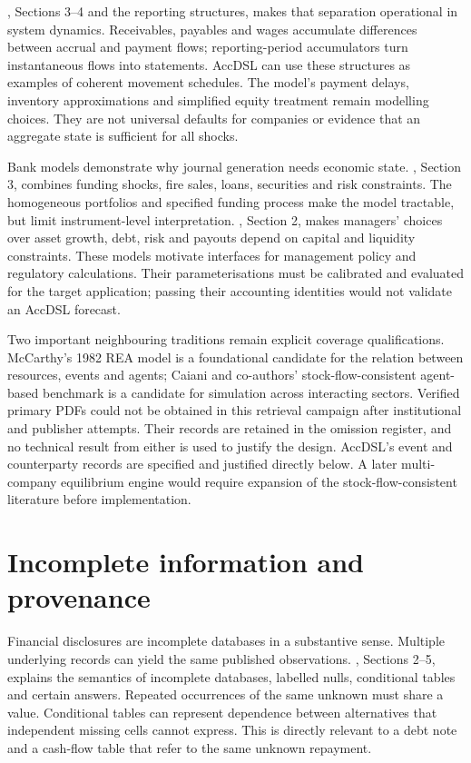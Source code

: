 \citet{pierson2020}, Sections 3--4 and the reporting structures, makes that
separation operational in system dynamics. Receivables, payables and wages
accumulate differences between accrual and payment flows; reporting-period
accumulators turn instantaneous flows into statements. AccDSL can use these
structures as examples of coherent movement schedules. The model's payment
delays, inventory approximations and simplified equity treatment remain
modelling choices. They are not universal defaults for companies or evidence
that an aggregate state is sufficient for all shocks.

Bank models demonstrate why journal generation needs economic state.
\citet{halaj2016}, Section 3, combines funding shocks, fire sales, loans,
securities and risk constraints. The homogeneous portfolios and specified
funding process make the model tractable, but limit instrument-level
interpretation. \citet{behn2019}, Section 2, makes managers' choices over asset
growth, debt, risk and payouts depend on capital and liquidity constraints.
These models motivate interfaces for management policy and regulatory
calculations. Their parameterisations must be calibrated and evaluated for
the target application; passing their accounting identities would not validate
an AccDSL forecast.

Two important neighbouring traditions remain explicit coverage qualifications.
McCarthy's 1982 REA model is a foundational candidate for the relation between
resources, events and agents; Caiani and co-authors' stock-flow-consistent
agent-based benchmark is a candidate for simulation across interacting sectors.
Verified primary PDFs could not be obtained in this retrieval campaign after
institutional and publisher attempts. Their records are retained in the omission
register, and no technical result from either is used to justify the design.
AccDSL's event and counterparty records are specified and justified directly
below. A later multi-company equilibrium engine would require expansion of
the stock-flow-consistent literature before implementation.

\section{Incomplete information and provenance}

Financial disclosures are incomplete databases in a substantive sense.
Multiple underlying records can yield the same published observations.
\citet{libkin2014}, Sections 2--5, explains the semantics of incomplete
databases, labelled nulls, conditional tables and certain answers. Repeated
occurrences of the same unknown must share a value. Conditional tables can
represent dependence between alternatives that independent missing cells
cannot express. This is directly relevant to a debt note and a cash-flow table
that refer to the same unknown repayment.

